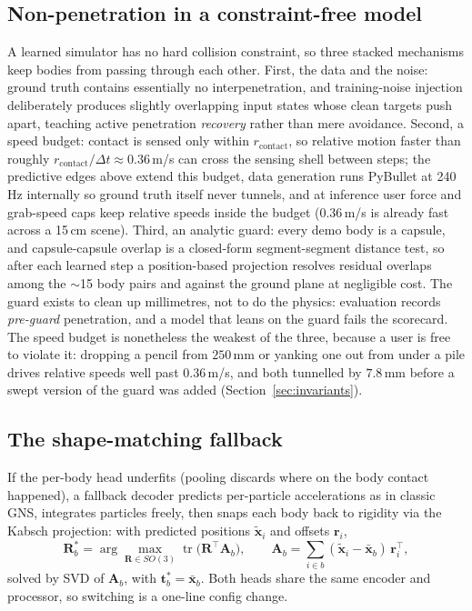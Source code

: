 \documentclass[11pt]{article}
\newcommand{\x}{\mathbf{x}}
\newcommand{\R}{\mathbf{R}}
\newcommand{\tr}{\mathbf{t}}
\begin{document}
\subsection{Non-penetration in a constraint-free model}
A learned simulator has no hard collision constraint, so three stacked mechanisms keep bodies from passing through each other. First, the data and the noise: ground truth contains essentially no interpenetration, and training-noise injection deliberately produces slightly overlapping input states whose clean targets push apart, teaching active penetration \emph{recovery} rather than mere avoidance. Second, a speed budget: contact is sensed only within $r_{\text{contact}}$, so relative motion faster than roughly $r_{\text{contact}}/\Delta t \approx 0.36$\,m/s can cross the sensing shell between steps; the predictive edges above extend this budget, data generation runs PyBullet at 240\,Hz internally so ground truth itself never tunnels, and at inference user force and grab-speed caps keep relative speeds inside the budget (0.36\,m/s is already fast across a 15\,cm scene). Third, an analytic guard: every demo body is a capsule, and capsule-capsule overlap is a closed-form segment-segment distance test, so after each learned step a position-based projection resolves residual overlaps among the $\sim$15 body pairs and against the ground plane at negligible cost. The guard exists to clean up millimetres, not to do the physics: evaluation records \emph{pre-guard} penetration, and a model that leans on the guard fails the scorecard. The speed budget is nonetheless the weakest of the three, because a user is free to violate it: dropping a pencil from $250$\,mm or yanking one out from under a pile drives relative speeds well past $0.36$\,m/s, and both tunnelled by $7.8$\,mm before a swept version of the guard was added (Section~\ref{sec:invariants}).

\subsection{The shape-matching fallback}
If the per-body head underfits (pooling discards where on the body contact happened), a fallback decoder predicts per-particle accelerations as in classic GNS, integrates particles freely, then snaps each body back to rigidity via the Kabsch projection: with predicted positions $\tilde{\x}_i$ and offsets $\mathbf{r}_i$,
\begin{equation}
\R_b^\ast = \arg\max_{\R \in SO(3)} \operatorname{tr}\!\big(\R^\top \mathbf{A}_b\big), \qquad
\mathbf{A}_b = \sum_{i \in b} (\tilde{\x}_i - \bar{\x}_b)\, \mathbf{r}_i^\top,
\end{equation}
solved by SVD of $\mathbf{A}_b$, with $\tr_b^\ast = \bar{\x}_b$. Both heads share the same encoder and processor, so switching is a one-line config change.
\end{document}
